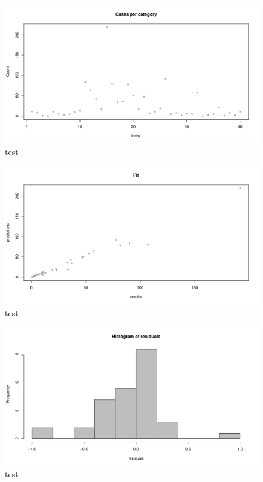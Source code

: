 \documentclass{article}
\begin{document}
\begin{figure}[h!]
\begin{center}
\includegraphics{interimreport2-025}
\end{center}
\caption{test}
\label{fig:test}
\end{figure}

\begin{figure}[h!]
\begin{center}
\includegraphics{interimreport2-026}
\end{center}
\caption{test}
\label{fig:test}
\end{figure}


\begin{figure}[h!]
\begin{center}
\includegraphics{interimreport2-028}
\end{center}
\caption{test}
\label{fig:test}
\end{figure}
\end{document}
